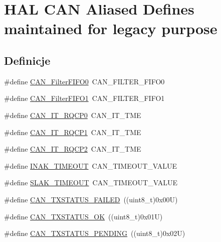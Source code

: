 \hypertarget{group___h_a_l___c_a_n___aliased___defines}{}\section{H\+AL C\+AN Aliased Defines maintained for legacy purpose}
\label{group___h_a_l___c_a_n___aliased___defines}
\subsection*{Definicje}
\begin{DoxyCompactItemize}
\item 
\#define \hyperlink{group___h_a_l___c_a_n___aliased___defines_ga1b3d041dff9fed4dad75ed2a4a0e27e0}{C\+A\+N\+\_\+\+Filter\+F\+I\+F\+O0}~C\+A\+N\+\_\+\+F\+I\+L\+T\+E\+R\+\_\+\+F\+I\+F\+O0
\item 
\#define \hyperlink{group___h_a_l___c_a_n___aliased___defines_gada8f9b3a9c88f36539aaeb457039e666}{C\+A\+N\+\_\+\+Filter\+F\+I\+F\+O1}~C\+A\+N\+\_\+\+F\+I\+L\+T\+E\+R\+\_\+\+F\+I\+F\+O1
\item 
\#define \hyperlink{group___h_a_l___c_a_n___aliased___defines_ga0c57058d6d14b2baa24a4895975b1371}{C\+A\+N\+\_\+\+I\+T\+\_\+\+R\+Q\+C\+P0}~C\+A\+N\+\_\+\+I\+T\+\_\+\+T\+ME
\item 
\#define \hyperlink{group___h_a_l___c_a_n___aliased___defines_ga42e5c8e89e0f06f3250916fcfb21dc22}{C\+A\+N\+\_\+\+I\+T\+\_\+\+R\+Q\+C\+P1}~C\+A\+N\+\_\+\+I\+T\+\_\+\+T\+ME
\item 
\#define \hyperlink{group___h_a_l___c_a_n___aliased___defines_gacc634c3e29cdc9622081021dcda3127b}{C\+A\+N\+\_\+\+I\+T\+\_\+\+R\+Q\+C\+P2}~C\+A\+N\+\_\+\+I\+T\+\_\+\+T\+ME
\item 
\#define \hyperlink{group___h_a_l___c_a_n___aliased___defines_ga60a32132df242146efd3e9f7a079f0f0}{I\+N\+A\+K\+\_\+\+T\+I\+M\+E\+O\+UT}~C\+A\+N\+\_\+\+T\+I\+M\+E\+O\+U\+T\+\_\+\+V\+A\+L\+UE
\item 
\#define \hyperlink{group___h_a_l___c_a_n___aliased___defines_ga1bb8107706c8b4039ac55a122f3c65bb}{S\+L\+A\+K\+\_\+\+T\+I\+M\+E\+O\+UT}~C\+A\+N\+\_\+\+T\+I\+M\+E\+O\+U\+T\+\_\+\+V\+A\+L\+UE
\item 
\#define \hyperlink{group___h_a_l___c_a_n___aliased___defines_gad6f04a4437ad8e83b154523f20985796}{C\+A\+N\+\_\+\+T\+X\+S\+T\+A\+T\+U\+S\+\_\+\+F\+A\+I\+L\+ED}~((uint8\+\_\+t)0x00\+U)
\item 
\#define \hyperlink{group___h_a_l___c_a_n___aliased___defines_ga01cd38ecda448043ba6a7870ab62fc2b}{C\+A\+N\+\_\+\+T\+X\+S\+T\+A\+T\+U\+S\+\_\+\+OK}~((uint8\+\_\+t)0x01\+U)
\item 
\#define \hyperlink{group___h_a_l___c_a_n___aliased___defines_gaf63b6b17ef36507122e0eaac8395aa1c}{C\+A\+N\+\_\+\+T\+X\+S\+T\+A\+T\+U\+S\+\_\+\+P\+E\+N\+D\+I\+NG}~((uint8\+\_\+t)0x02\+U)
\end{DoxyCompactItemize}


